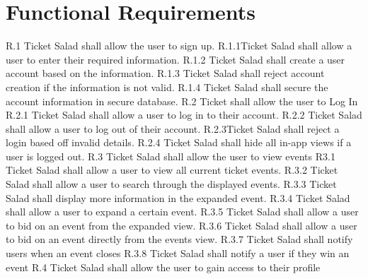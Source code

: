 \documentclass[11pt]{article}
\begin{document}
	\section{Functional Requirements}
	R.1 Ticket Salad shall allow the user to sign up. \newline
	R.1.1Ticket Salad shall allow a user to enter their required information.\newline
	R.1.2 Ticket Salad shall create a user account based on the information.\newline
	R.1.3 Ticket Salad shall reject account creation if the information is not valid.\newline
	R.1.4 Ticket Salad shall secure the account information in secure database.\newline\newline
	R.2 Ticket shall allow the user to Log In\newline
	R.2.1 Ticket Salad shall allow a user to log in to their account.\newline
	R.2.2 Ticket Salad shall allow a user to log out of their account.\newline
	R.2.3Ticket Salad shall reject a login based off invalid details.\newline
	R.2.4 Ticket Salad shall hide all in-app views if a user is logged out.\newline\newline
	R.3 Ticket Salad shall allow the user to view events
	\newline R3.1 Ticket Salad shall allow a user to view all current ticket events.
	\newline R.3.2 Ticket Salad shall allow a user to search through the displayed events.
	\newline R.3.3 Ticket Salad shall display more information in the expanded event.
	\newline R.3.4 Ticket Salad shall allow a user to expand a certain event.
	\newline R.3.5 Ticket Salad shall allow a user to bid on an event from the expanded view.
	\newline R.3.6 Ticket Salad shall allow a user to bid on an event directly from the events view.
	\newline R.3.7 Ticket Salad shall notify users when an event closes
	\newline R.3.8 Ticket Salad shall notify a user if they win an event \newline\newline
	R.4 Ticket Salad shall allow the user to gain access to their profile
\end{document}
